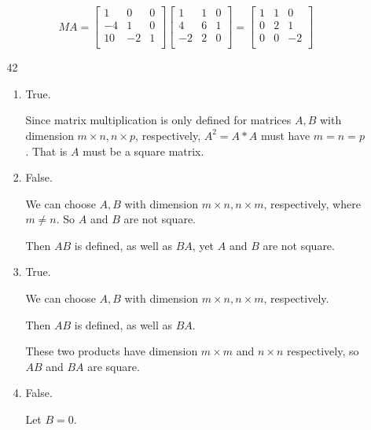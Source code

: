 \documentclass[12pt,letterpaper]{article}
\begin{document}
\begin{enumerate}
\begin{enumerate}
          \[
            MA
            =
            \begin{bmatrix}
              1  & 0  & 0 \\
              -4 & 1  & 0 \\
              10 & -2 & 1 \\
            \end{bmatrix}
            \begin{bmatrix}
              1  & 1  & 0 \\
              4  & 6  & 1 \\
              -2 & 2  & 0 \\
            \end{bmatrix}
            =
            \begin{bmatrix}
              1  & 1  & 0  \\
              0  & 2  & 1  \\
              0  & 0  & -2 \\
            \end{bmatrix}
          \]
        \item [42]
          \begin{enumerate}[label=(\alph*)]
            \item
              True.

              Since matrix multiplication is only defined for matrices $A, B$ with dimension $m \times n, n \times p$, respectively,
              $A^2 = A*A$ must have $m = n = p$.
              That is $A$ must be a square matrix.
            \item
              False.

              We can choose $A, B$ with dimension $m \times n, n \times m$, respectively, where $m \ne n$.
              So $A$ and $B$ are not square.

              Then $AB$ is defined, as well as $BA$, yet $A$ and $B$ are not square.
            \item
              True.

              We can choose $A, B$ with dimension $m \times n, n \times m$, respectively.

              Then $AB$ is defined, as well as $BA$.

              These two products have dimension $m \times m$ and $n \times n$ respectively,
              so $AB$ and $BA$ are square.
            \item
              False.

              Let $B = 0$.


\end{enumerate}
\end{enumerate}
\end{enumerate}
\end{document}
